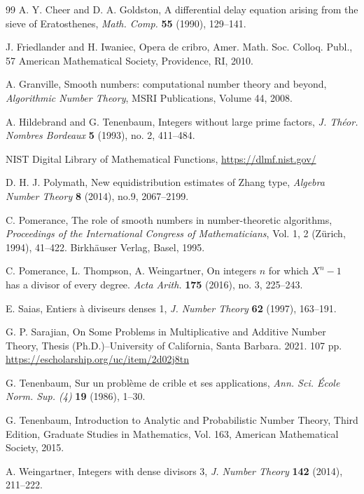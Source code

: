 \documentclass[11pt]{amsart}
\begin{document}
\begin{thebibliography}{99}
A. Y. Cheer and D. A. Goldston, A differential delay equation arising from the sieve of Eratosthenes, \textit{Math. Comp.} \textbf{55} (1990), 129--141.

J. Friedlander and H. Iwaniec, 
Opera de cribro,
Amer. Math. Soc. Colloq. Publ., 57
American Mathematical Society, Providence, RI, 2010. 

A. Granville, Smooth numbers: computational number theory and beyond, \textit{Algorithmic Number Theory}, MSRI Publications, Volume 44, 2008.

A. Hildebrand and G. Tenenbaum,
Integers without large prime factors,
\textit{J. Théor. Nombres Bordeaux} \textbf{5} (1993), no. 2, 411--484.

NIST Digital Library of Mathematical Functions, \url{https://dlmf.nist.gov/}

D. H. J. Polymath, 
New equidistribution estimates of Zhang type, \textit{Algebra Number Theory} \textbf{8} (2014), no.9, 2067--2199.


C. Pomerance,
The role of smooth numbers in number-theoretic algorithms, \textit{Proceedings of the International Congress of Mathematicians}, Vol. 1, 2 (Zürich, 1994), 
41--422.
Birkhäuser Verlag, Basel, 1995.

C. Pomerance, L. Thompson, A. Weingartner,
On integers $n$ for which $X^n-1$ has a divisor of every degree.
\textit{Acta Arith.} \textbf{175} (2016), no. 3, 225--243.

E. Saias, Entiers \`{a} diviseurs denses 1, \textit{J. Number
Theory} \textbf{62} (1997), 163--191.

G. P. Sarajian, 
On Some Problems in Multiplicative and Additive Number Theory,
Thesis (Ph.D.)–University of California, Santa Barbara. 2021. 107 pp.
\url{https://escholarship.org/uc/item/2d02j8tn}

G. Tenenbaum, Sur un probl\`{e}me de crible et ses applications,
\textit{Ann. Sci. \'{E}cole Norm. Sup. (4)} \textbf{19} (1986),
1--30.

G. Tenenbaum, Introduction to Analytic and Probabilistic Number Theory, Third Edition, Graduate Studies in Mathematics, Vol. 163, American Mathematical Society, 2015.

A. Weingartner, Integers with dense divisors 3, \textit{J. Number Theory} \textbf{142} (2014), 211--222.


\end{thebibliography}
\end{document}
